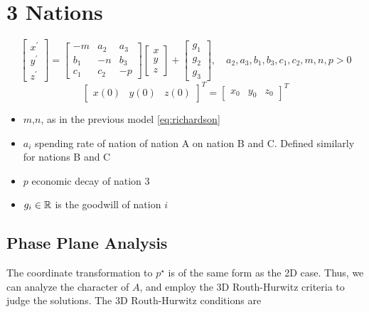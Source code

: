\documentclass[12pt]{article}
\begin{document}
\section{3 Nations}
    \begin{equation}\label{eq:nation}
    \begin{bmatrix}
      x^\prime \\ y^\prime \\ z^\prime
    \end{bmatrix}
    = \begin{bmatrix}
      -m & a_{2} & a_{3} \\
      b_1 & -n & b_3 \\
      c_1 & c_2 & -p
      \end{bmatrix}
      \begin{bmatrix}
	x \\ y \\ z
	\end{bmatrix}+\begin{bmatrix}g_{1}\\g_{2}\\g_{3}\end{bmatrix},\quad a_2,a_3,b_1,b_3,c_1,c_2,m,n,p>0
  \end{equation}
  \[ \begin{bmatrix}x(0)&y(0)&z(0)\end{bmatrix}^T=\begin{bmatrix}x_0 & y_0 & z_0\end{bmatrix}^T
\]
    \begin{itemize}
      \item $m$,$n$, as in the previous model \autoref{eq:richardson}
      \item $a_i$ spending rate of nation of nation A on nation B and C. Defined similarly for nations B and C
      \item $p$ economic decay of nation 3
      \item $g_i\in\mathbb{R}$ is the goodwill of nation $i$
    \end{itemize}

\subsection{Phase Plane Analysis}
  The coordinate transformation to $p^\star$ is of the same form as the 2D case. Thus, we can analyze the character of $A$, and employ the 3D Routh-Hurwitz criteria to judge the solutions. The 3D Routh-Hurwitz conditions are\cite{Li2018}
\end{document}

